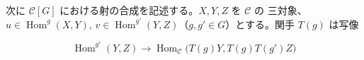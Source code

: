 次に $\mathcal C[G]$ における射の合成を記述する。$X,Y,Z$ を $\mathcal C$ の
三対象、$u\in\operatorname{Hom}^{g}(X,Y)$,
$v\in\operatorname{Hom}^{g'}(Y,Z)$（$g,g'\in G$）とする。関手 $T(g)$ は写像

\begin{equation}
  \operatorname{Hom}^{g'}(Y,Z)
  \longrightarrow
  \operatorname{Hom}_{\mathcal C}
    \bigl(T(g)Y,T(g)T(g')Z\bigr)
  \tag{1.3.2.3}
\end{equation}
